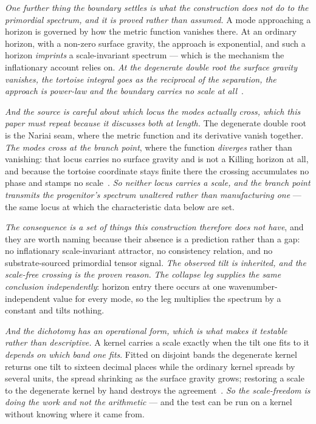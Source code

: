 \documentclass[11pt,a4paper]{article}
\theoremstyle{plain}
\theoremstyle{definition}
\begin{document}
\emph{One further thing the boundary settles is what the construction does \emph{not} do to the primordial
spectrum, and it is proved rather than assumed.} A mode approaching a horizon is governed by how the metric
function vanishes there. At an ordinary horizon, with a non-zero surface gravity, the approach is
exponential, and such a horizon \emph{imprints} a scale-invariant spectrum --- which is the mechanism the
inflationary account relies on. \emph{At the degenerate double root the surface gravity vanishes, the
tortoise integral goes as the reciprocal of the separation, the approach is power-law and the boundary
carries no scale at all}~\cite{JanzenCRcosmology}.

\emph{And the source is careful about which locus the modes actually cross, which this paper must repeat
because it discusses both at length.} The degenerate double root is the Nariai seam, where the metric function and its
derivative vanish together. \emph{The modes cross at the branch point}, where the function \emph{diverges}
rather than vanishing: that locus carries no surface gravity and is not a Killing horizon at all, and because
the tortoise coordinate stays finite there the crossing accumulates no phase and stamps no
scale~\cite{JanzenCRcosmology}. \emph{So neither locus carries a scale, and the branch point transmits the
progenitor's spectrum unaltered rather than manufacturing one} --- the same locus at which the characteristic
data below are set.

\emph{The consequence is a set of things this construction therefore does not have}, and they are worth
naming because their absence is a prediction rather than a gap: no inflationary scale-invariant attractor, no
consistency relation, and no substrate-sourced primordial tensor signal. \emph{The observed tilt is
inherited, and the scale-free crossing is the proven reason.} \emph{The collapse leg supplies the same conclusion
independently}: horizon entry there occurs at one wavenumber-independent value for every mode, so the leg
multiplies the spectrum by a constant and tilts nothing.

\emph{And the dichotomy has an operational form, which is what makes it testable rather than descriptive.} A
kernel carries a scale exactly when the tilt one fits to it \emph{depends on which band one fits}. Fitted on
disjoint bands the degenerate kernel returns one tilt to sixteen decimal places while the ordinary kernel
spreads by several units, the spread shrinking as the surface gravity grows; restoring a scale to the
degenerate kernel by hand destroys the agreement~\cite{JanzenCRcosmology}. \emph{So the scale-freedom is
doing the work and not the arithmetic} --- and the test can be run on a kernel without knowing where it came
from.
\end{document}
